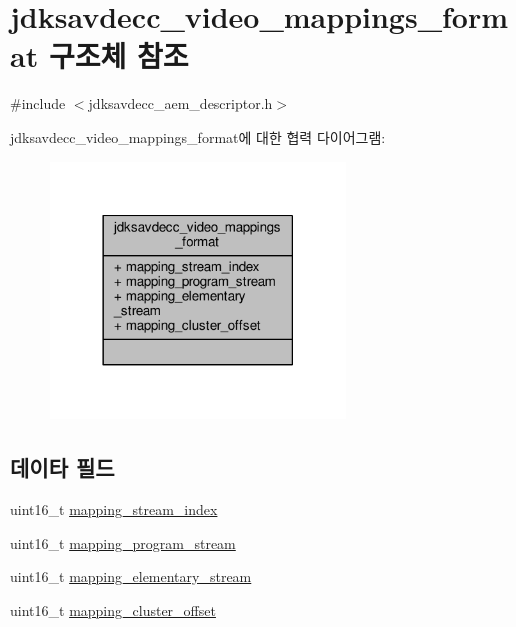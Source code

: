 \hypertarget{structjdksavdecc__video__mappings__format}{}\section{jdksavdecc\+\_\+video\+\_\+mappings\+\_\+format 구조체 참조}
\label{structjdksavdecc__video__mappings__format}


{\ttfamily \#include $<$jdksavdecc\+\_\+aem\+\_\+descriptor.\+h$>$}



jdksavdecc\+\_\+video\+\_\+mappings\+\_\+format에 대한 협력 다이어그램\+:
\nopagebreak
\begin{figure}[H]
\begin{center}
\leavevmode
\includegraphics[width=222pt]{structjdksavdecc__video__mappings__format__coll__graph}
\end{center}
\end{figure}
\subsection*{데이타 필드}
\begin{DoxyCompactItemize}
\item 
uint16\+\_\+t \hyperlink{structjdksavdecc__video__mappings__format_ae776f05f1f60f83a69c154844271ca4a}{mapping\+\_\+stream\+\_\+index}
\item 
uint16\+\_\+t \hyperlink{structjdksavdecc__video__mappings__format_a71a5421044e2dd9e8a1bc1667b0acf84}{mapping\+\_\+program\+\_\+stream}
\item 
uint16\+\_\+t \hyperlink{structjdksavdecc__video__mappings__format_a17b2b1b6c4e5fe6a591563df87fc2cd4}{mapping\+\_\+elementary\+\_\+stream}
\item 
uint16\+\_\+t \hyperlink{structjdksavdecc__video__mappings__format_ab57e85d38dacb8e4e841cf9f1fbd7a36}{mapping\+\_\+cluster\+\_\+offset}
\end{DoxyCompactItemize}


